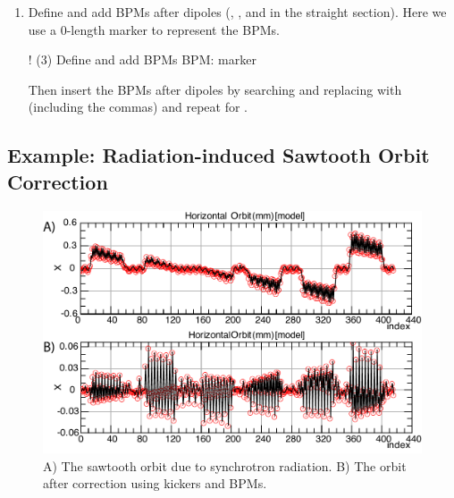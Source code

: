 \documentclass{hitec}     %
\begin{document}
{{{{\begin{enumerate}[leftmargin=*]
Because we have used D1 drifts repeatedly throughout the ring, adding correctors manually is a tedious task. The easiest approach is to use  in Find and Replace. The recipe is the following: 
\begin{code}
1. In the forward arcs for drifts after focusing quadrupoles:
    Replace (QF[^,\n]*,[^,\n]*)D1 with \1D1C1, CH, D1C2 for 
2. In the forward arcs for drifts after defocusing quadrupoles:
    Replace (QD[^,\n]*,[^,\n]*)D1 with \1D1C1, CV, D1C2
3. In the reverse arcs for drifts before focusing quadrupoles:
    Replace (D1)([^,\n]*,[^,\n]*QF), with D1C2, CH, D1C1. In the reverse arcs for drifts before defocusing quadrupoles:
    Replace (D1)([^,\n]*,[^,\n]*QD), with D1C2, CV, D1C1. In the reverse arcs for drifts at the end of a cell:
    Replace D1) with D1C2, CH, D1C1) 
\end{code}
In some text editors, you may need to use \$1 and \$2 instead of \textbackslash 1 and \textbackslash 2.
\item Define and add BPMs after dipoles (, , and  in the straight section). Here we use a 0-length marker to represent the BPMs.
\begin{code}
! (3) Define and add BPMs
BPM: marker
\end{code}
Then insert the BPMs after dipoles by searching and replacing  with  (including the commas) and repeat for .
\end{enumerate}

\subsection{Example: Radiation-induced Sawtooth Orbit Correction}
\label{s:sawtooth}

\begin{figure}[!h]
  \centering
  \includegraphics[width=0.9\linewidth]{figures/sawtooth.pdf}
  \caption{A) The sawtooth orbit due to synchrotron radiation. B) The orbit after correction using kickers and BPMs.}
  \label{f:sawtooth}
\end{figure}

}}}}
\end{document}
